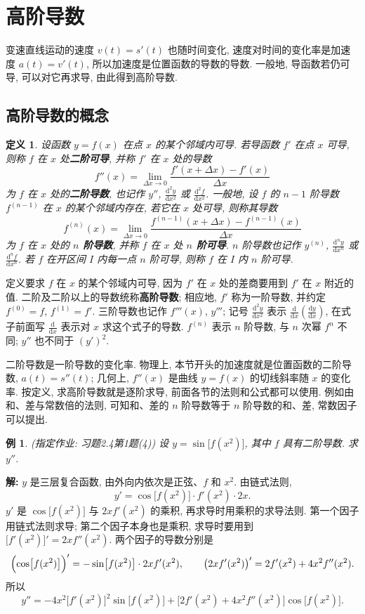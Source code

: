 \documentclass[UTF8,openany]{ctexbook}
\theoremstyle{chinesetextbook}
\newtheorem{example}{例}[section]
\newenvironment{cnsolution}{\par\indent\textbf{解:} \ignorespaces}{\par}
\newtheorem*{definitionsingle}{定义}
\newcommand{\dd}{\mathrm d}
\begin{document}
\section{高阶导数}
变速直线运动的速度 $v(t)=s'(t)$ 也随时间变化, 速度对时间的变化率是加速度 $a(t)=v'(t)$, 所以加速度是位置函数的导数的导数. 一般地, 导函数若仍可导, 可以对它再求导, 由此得到高阶导数.
\subsection{高阶导数的概念}
\begin{definitionsingle}
设函数 $y=f(x)$ 在点 $x$ 的某个邻域内可导. 若导函数 $f'$ 在点 $x$ 可导, 则称 $f$ 在 $x$ 处\textbf{二阶可导}, 并称 $f'$ 在 $x$ 处的导数
\[
f''(x)=\lim_{\Delta x\to0}\frac{f'(x+\Delta x)-f'(x)}{\Delta x}
\]
为 $f$ 在 $x$ 处的\textbf{二阶导数}, 也记作 $y''$, $\displaystyle\frac{\dd^2y}{\dd x^2}$ 或 $\displaystyle\frac{\dd^2f}{\dd x^2}$. 一般地, 设 $f$ 的 $n-1$ 阶导数 $f^{(n-1)}$ 在 $x$ 的某个邻域内存在, 若它在 $x$ 处可导, 则称其导数
\[
f^{(n)}(x)=\lim_{\Delta x\to0}\frac{f^{(n-1)}(x+\Delta x)-f^{(n-1)}(x)}{\Delta x}
\]
为 $f$ 在 $x$ 处的 \textbf{$n$ 阶导数}, 并称 $f$ 在 $x$ 处 \textbf{$n$ 阶可导}. $n$ 阶导数也记作 $y^{(n)}$, $\displaystyle\frac{\dd^ny}{\dd x^n}$ 或 $\displaystyle\frac{\dd^nf}{\dd x^n}$. 若 $f$ 在开区间 $I$ 内每一点 $n$ 阶可导, 则称 $f$ 在 $I$ 内 $n$ 阶可导.
\end{definitionsingle}
定义要求 $f$ 在 $x$ 的某个邻域内可导, 因为 $f'$ 在 $x$ 处的差商要用到 $f'$ 在 $x$ 附近的值. 二阶及二阶以上的导数统称\textbf{高阶导数}; 相应地, $f'$ 称为一阶导数, 并约定 $f^{(0)}=f$, $f^{(1)}=f'$. 三阶导数也记作 $f'''(x)$, $y'''$; 记号 $\displaystyle\frac{\dd^2y}{\dd x^2}$ 表示 $\displaystyle\frac{\dd}{\dd x}\left(\frac{\dd y}{\dd x}\right)$, 在式子前面写 $\displaystyle\frac{\dd}{\dd x}$ 表示对 $x$ 求这个式子的导数. $f^{(n)}$ 表示 $n$ 阶导数, 与 $n$ 次幂 $f^n$ 不同; $y''$ 也不同于 $(y')^2$.

二阶导数是一阶导数的变化率. 物理上, 本节开头的加速度就是位置函数的二阶导数, $a(t)=s''(t)$; 几何上, $f''(x)$ 是曲线 $y=f(x)$ 的切线斜率随 $x$ 的变化率. 按定义, 求高阶导数就是逐阶求导, 前面各节的法则和公式都可以使用. 例如由和、差与常数倍的法则, 可知和、差的 $n$ 阶导数等于 $n$ 阶导数的和、差, 常数因子可以提出.
\begin{example}\label{ex:c2-h4-1a}
\textnormal{(指定作业: 习题2.4第1题(4))} 设 $y=\sin\bigl[f(x^2)\bigr]$, 其中 $f$ 具有二阶导数. 求 $y''$.
\end{example}
\begin{cnsolution}
$y$ 是三层复合函数, 由外向内依次是正弦、$f$ 和 $x^2$. 由链式法则,
\[
y'=\cos\bigl[f(x^2)\bigr]\cdot f'(x^2)\cdot2x.
\]
$y'$ 是 $\cos\bigl[f(x^2)\bigr]$ 与 $2xf'(x^2)$ 的乘积, 再求导时用乘积的求导法则. 第一个因子用链式法则求导; 第二个因子本身也是乘积, 求导时要用到 $\bigl[f'(x^2)\bigr]'=2xf''(x^2)$. 两个因子的导数分别是
\[
\Bigl(\cos\bigl[f(x^2)\bigr]\Bigr)'=-\sin\bigl[f(x^2)\bigr]\cdot2xf'(x^2),\qquad\bigl(2xf'(x^2)\bigr)'=2f'(x^2)+4x^2f''(x^2).
\]
所以
\[
y''=-4x^2\bigl[f'(x^2)\bigr]^2\sin\bigl[f(x^2)\bigr]+\bigl[2f'(x^2)+4x^2f''(x^2)\bigr]\cos\bigl[f(x^2)\bigr].
\]
\end{cnsolution}
\end{document}
